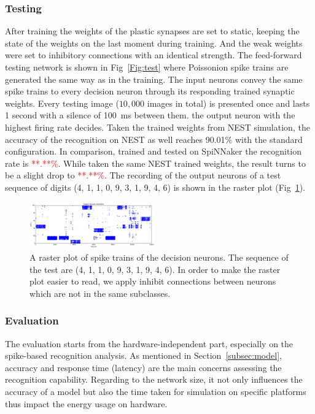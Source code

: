 \subsubsection{Testing}
After training the weights of the plastic synapses are set to static, keeping the state of the weights on the last moment during training.
And the weak weights were set to inhibitory connections with an identical strength.
The feed-forward testing network is shown in Fig~\ref{Fig:test} where Poissonion spike trains are generated the same way as in the training.
The input neurons convey the same spike trains to every decision neuron through its responding trained synaptic weights. 
Every testing image ($10,000$ images in total) is presented once and lasts 1 second with a silence of 100~ms between them.
the output neuron with the highest firing rate decides.
Taken the trained weights from NEST simulation, the accuracy of the recognition on NEST as well reaches 90.01\% with the standard configuration.
In comparison, trained and tested on SpiNNaker the recognition rate is \textcolor{red}{**.**\%}.
While taken the same NEST trained weights, the result turns to be a slight drop to  \textcolor{red}{**.**\%}.
The recording of the output neurons of a test sequence of digits (4, 1, 1, 0, 9, 3, 1, 9, 4, 6) is shown in the raster plot (Fig~\ref{Fig:output}).


\begin{figure}[hbt!]
	\centering
	\includegraphics[width=0.48\textwidth]{images/test300-301.pdf}
	\caption{A raster plot of spike trains of the decision neurons. The sequence of the test are (4, 1, 1, 0, 9, 3, 1, 9, 4, 6). In order to make the raster plot easier to read, we apply inhibit connections between neurons which are not in the same subclasses.}
	\label{Fig:output}
\end{figure} 
\subsubsection{Evaluation}
The evaluation starts from the hardware-independent part, especially on the spike-based recognition analysis.
As mentioned in Section~\ref{subsec:model}, accuracy and response time (latency) are the main concerns assessing the recognition capability.
Regarding to the network size, it not only influences the accuracy of a model but also the time taken for simulation on specific platforms thus impact the energy usage on hardware. 

